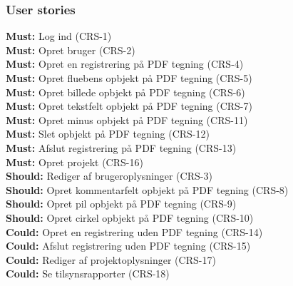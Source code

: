 \subsubsection{User stories}
\textbf{Must:} Log ind (CRS-1) \\
\textbf{Must:} Opret bruger (CRS-2) \\
\textbf{Must:} Opret en registrering på PDF tegning (CRS-4) \\
\textbf{Must:} Opret fluebens opbjekt på PDF tegning (CRS-5) \\
\textbf{Must:} Opret billede opbjekt på PDF tegning (CRS-6) \\
\textbf{Must:} Opret tekstfelt opbjekt på PDF tegning (CRS-7) \\
\textbf{Must:} Opret minus opbjekt på PDF tegning (CRS-11) \\
\textbf{Must:} Slet opbjekt på PDF tegning (CRS-12) \\
\textbf{Must:} Afslut registrering på PDF tegning (CRS-13) \\
\textbf{Must:} Opret projekt (CRS-16) \\

\textbf{Should:} Rediger af brugeroplysninger (CRS-3) \\
\textbf{Should:} Opret kommentarfelt opbjekt på PDF tegning (CRS-8) \\
\textbf{Should:} Opret pil opbjekt på PDF tegning (CRS-9) \\
\textbf{Should:} Opret cirkel opbjekt på PDF tegning (CRS-10) \\

\textbf{Could:} Opret en registrering uden PDF tegning (CRS-14) \\
\textbf{Could:} Afslut registrering uden PDF tegning (CRS-15) \\
\textbf{Could:} Rediger af projektoplysninger (CRS-17) \\
\textbf{Could:} Se tilsynsrapporter (CRS-18) \\

